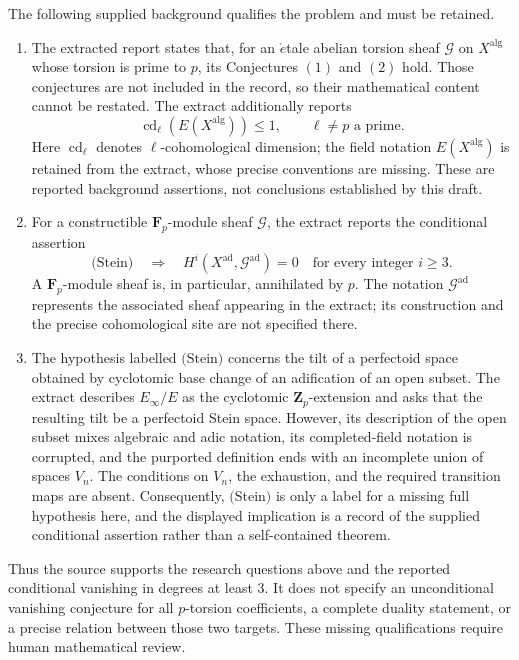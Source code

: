 \documentclass[11pt]{article}
\begin{document}
The following supplied background qualifies the problem and must be retained.
\begin{enumerate}
\item The extracted report states that, for an \(\acute{e}\)tale abelian torsion sheaf \(\mathcal G\) on \(X^{\mathrm{alg}}\) whose torsion is prime to \(p\), its Conjectures \((1)\) and \((2)\) hold. Those conjectures are not included in the record, so their mathematical content cannot be restated. The extract additionally reports
\[
\operatorname{cd}_{\ell}\!\left(E(X^{\mathrm{alg}})\right)\leq 1,
\qquad \ell\neq p\text{ a prime}.
\]
Here \(\operatorname{cd}_{\ell}\) denotes \(\ell\)-cohomological dimension; the field notation \(E(X^{\mathrm{alg}})\) is retained from the extract, whose precise conventions are missing. These are reported background assertions, not conclusions established by this draft.
\item For a constructible \(\mathbf F_p\)-module sheaf \(\mathcal G\), the extract reports the conditional assertion
\[
\text{(Stein)}\quad\Longrightarrow\quad
H^i\!\left(X^{\mathrm{ad}},\mathcal G^{\mathrm{ad}}\right)=0
\quad\text{for every integer }i\geq 3.
\]
A \(\mathbf F_p\)-module sheaf is, in particular, annihilated by \(p\). The notation \(\mathcal G^{\mathrm{ad}}\) represents the associated sheaf appearing in the extract; its construction and the precise cohomological site are not specified there.
\item The hypothesis labelled \(\text{(Stein)}\) concerns the tilt of a perfectoid space obtained by cyclotomic base change of an adification of an open subset. The extract describes \(E_\infty/E\) as the cyclotomic \(\mathbf Z_p\)-extension and asks that the resulting tilt be a perfectoid Stein space. However, its description of the open subset mixes algebraic and adic notation, its completed-field notation is corrupted, and the purported definition ends with an incomplete union of spaces \(V_n\). The conditions on \(V_n\), the exhaustion, and the required transition maps are absent. Consequently, \(\text{(Stein)}\) is only a label for a missing full hypothesis here, and the displayed implication is a record of the supplied conditional assertion rather than a self-contained theorem.
\end{enumerate}

Thus the source supports the research questions above and the reported conditional vanishing in degrees at least \(3\). It does not specify an unconditional vanishing conjecture for all \(p\)-torsion coefficients, a complete duality statement, or a precise relation between those two targets. These missing qualifications require human mathematical review.
\end{document}
